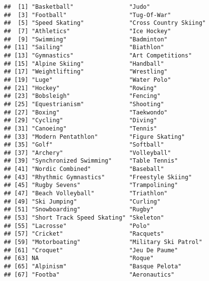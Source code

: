 \documentclass[
]{article}
\newenvironment{Shaded}{\begin{snugshade}}{\end{snugshade}}
\newcommand{\AttributeTok}[1]{\textcolor[rgb]{0.77,0.63,0.00}{#1}}
\newcommand{\FunctionTok}[1]{\textcolor[rgb]{0.00,0.00,0.00}{#1}}
\newcommand{\NormalTok}[1]{#1}
\newcommand{\OtherTok}[1]{\textcolor[rgb]{0.56,0.35,0.01}{#1}}
\newcommand{\SpecialCharTok}[1]{\textcolor[rgb]{0.00,0.00,0.00}{#1}}
\newcommand{\StringTok}[1]{\textcolor[rgb]{0.31,0.60,0.02}{#1}}
\begin{document}
\begin{verbatim}
##  [1] "Basketball"                "Judo"                     
##  [3] "Football"                  "Tug-Of-War"               
##  [5] "Speed Skating"             "Cross Country Skiing"     
##  [7] "Athletics"                 "Ice Hockey"               
##  [9] "Swimming"                  "Badminton"                
## [11] "Sailing"                   "Biathlon"                 
## [13] "Gymnastics"                "Art Competitions"         
## [15] "Alpine Skiing"             "Handball"                 
## [17] "Weightlifting"             "Wrestling"                
## [19] "Luge"                      "Water Polo"               
## [21] "Hockey"                    "Rowing"                   
## [23] "Bobsleigh"                 "Fencing"                  
## [25] "Equestrianism"             "Shooting"                 
## [27] "Boxing"                    "Taekwondo"                
## [29] "Cycling"                   "Diving"                   
## [31] "Canoeing"                  "Tennis"                   
## [33] "Modern Pentathlon"         "Figure Skating"           
## [35] "Golf"                      "Softball"                 
## [37] "Archery"                   "Volleyball"               
## [39] "Synchronized Swimming"     "Table Tennis"             
## [41] "Nordic Combined"           "Baseball"                 
## [43] "Rhythmic Gymnastics"       "Freestyle Skiing"         
## [45] "Rugby Sevens"              "Trampolining"             
## [47] "Beach Volleyball"          "Triathlon"                
## [49] "Ski Jumping"               "Curling"                  
## [51] "Snowboarding"              "Rugby"                    
## [53] "Short Track Speed Skating" "Skeleton"                 
## [55] "Lacrosse"                  "Polo"                     
## [57] "Cricket"                   "Racquets"                 
## [59] "Motorboating"              "Military Ski Patrol"      
## [61] "Croquet"                   "Jeu De Paume"             
## [63] NA                          "Roque"                    
## [65] "Alpinism"                  "Basque Pelota"            
## [67] "Footba"                    "Aeronautics"
\end{verbatim}

\begin{Shaded}
\end{Shaded}
\end{document}
